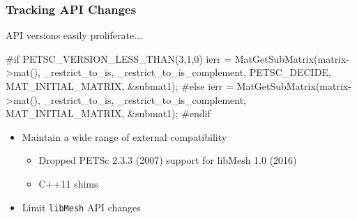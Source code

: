 \documentclass[mathserif]{beamer}
\newcommand{\libMesh}{\texttt{libMesh}\xspace}
\begin{document}
\begin{frame}[fragile]
\frametitle{Tracking API Changes}

\begin{block}{API versions easily proliferate...}
\small
\begin{semiverbatim}
#if PETSC_VERSION_LESS_THAN(3,1,0)
  ierr = MatGetSubMatrix(matrix->mat(),
           _restrict_to_is, _restrict_to_is_complement,
           \alert{PETSC_DECIDE}, MAT_INITIAL_MATRIX, &submat1);
#else
  ierr = MatGetSubMatrix(matrix->mat(),
           _restrict_to_is, _restrict_to_is_complement,
           MAT_INITIAL_MATRIX, &submat1);
#endif
\end{semiverbatim}
\end{block}

\begin{itemize}
	\item Maintain a wide range of external compatibility
        \begin{itemize}
            \item Dropped PETSc 2.3.3 (2007) support for libMesh 1.0 (2016)
            \item C++11 shims
        \end{itemize}
	\item Limit \libMesh{} API changes
\end{itemize}

\end{frame}
\end{document}
